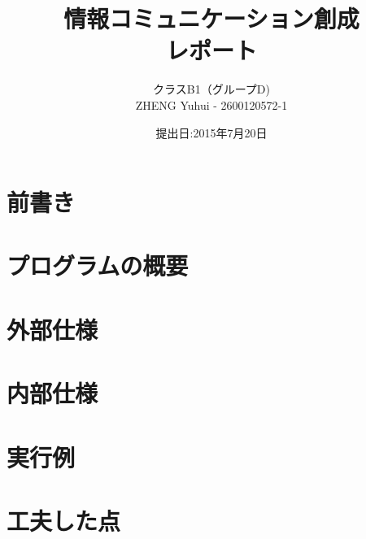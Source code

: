 \documentclass{jarticle}
\title{情報コミュニケーション創成\\レポート}
\author{クラスB1（グループD)\\ZHENG Yuhui - 2600120572-1}
\date{提出日:2015年7月20日}
\begin{document}
\maketitle
\tableofcontents
\clearpage

\section{前書き}
	
\section{プログラムの概要}
	
\section{外部仕様}
	
\section{内部仕様}
	
\section{実行例}
	
\section{工夫した点}
	
\end{document}
